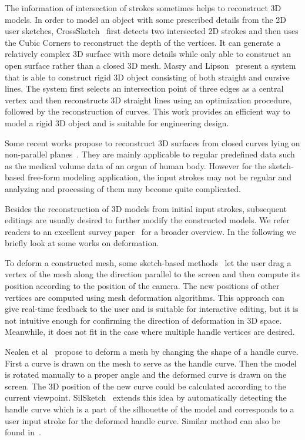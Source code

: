 The information of intersection of strokes sometimes helps to reconstruct 3D models. In order to model an object with some prescribed details from the 2D user sketches, CrossSketch~\cite{ASN07} first detects two intersected 2D strokes and then uses the Cubic Corners to reconstruct the depth of the vertices. It can generate a relatively complex 3D surface with more details while only able to construct an open surface rather than a closed 3D mesh. Masry and Lipson~\cite{ML07} present a system that is able to construct rigid 3D object consisting of both straight and cursive lines. The system first selects an intersection point of three edges as a central vertex and then reconstructs 3D straight lines using an optimization procedure, followed by the reconstruction of curves. This work provides an efficient way to model a rigid 3D object and is suitable for engineering design.

Some recent works propose to reconstruct 3D surfaces from closed curves lying on non-parallel planes~\cite{LBDLJ08,SLJGAGL09}. They are mainly applicable to regular predefined data such as the medical volume data of an organ of human body. However for the sketch-based free-form modeling application, the input strokes may not be regular and analyzing and processing of them may become quite complicated.

Besides the reconstruction of 3D models from initial input strokes, subsequent editings are usually desired to further modify the constructed models. We refer readers to an excellent survey paper~\cite{OSSJ09} for a broader overview. In the following we briefly look at some works on deformation.

To deform a constructed mesh, some sketch-based methods~\cite{NISA07,SCLARS04,SA07} let the user drag a vertex of the mesh along the direction parallel to the screen and then compute its position according to the position of the camera. The new positions of other vertices are computed using mesh deformation algorithms. This approach can give real-time feedback to the user and is suitable for interactive editing, but it is not intuitive enough for confirming the direction of deformation in 3D space. Meanwhile, it does not fit in the case where multiple handle vertices are desired.

Nealen et al~\cite{NSAC05} propose to deform a mesh by changing the shape of a handle curve. First a curve is drawn on the mesh to serve as the handle curve. Then the model is rotated manually to a proper angle and the deformed curve is drawn on the screen. The 3D position of the new curve could be calculated according to the current viewpoint. SilSketch~\cite{ZNA07} extends this idea by automatically detecting the handle curve which is a part of the silhouette of the model and corresponds to a user input stroke for the deformed handle curve. Similar method can also be found in~\cite{KSV09}.


